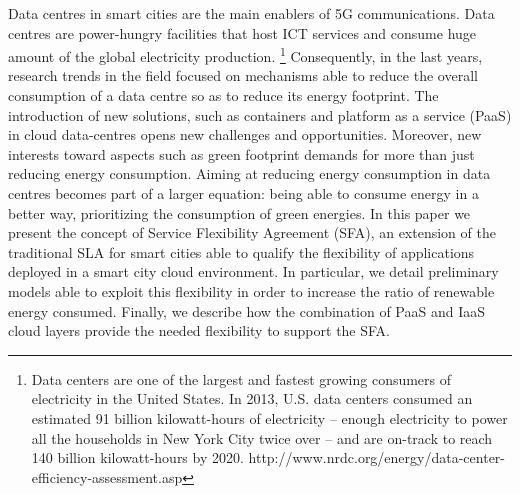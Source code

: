 Data centres in smart cities are the main enablers of 5G communications. Data centres are power-hungry facilities that host ICT services and consume huge amount of the global electricity production. \footnote{Data centers are one of the largest and fastest growing consumers of electricity in the United States. In 2013, U.S. data centers consumed an estimated 91 billion kilowatt-hours of electricity -- enough electricity to power all the households in New York City twice over -- and are on-track to reach 140 billion kilowatt-hours by 2020. http://www.nrdc.org/energy/data-center-efficiency-assessment.asp}
Consequently, in the last years, research trends in the field focused on mechanisms able to reduce the overall consumption of a data centre so as to reduce its energy footprint.
The introduction of new solutions, such as containers and platform as a service (PaaS) in cloud data-centres opens new challenges and opportunities.
Moreover, new interests toward aspects such as green footprint demands for more than just reducing energy consumption. 
Aiming at reducing energy consumption in data centres becomes part of a larger equation: being able to consume energy in a better way, prioritizing the consumption of green energies.
In this paper we present the concept of Service Flexibility Agreement (SFA), an extension of the traditional SLA for smart cities able to qualify the flexibility of applications deployed in a smart city cloud environment.
In particular, we detail preliminary models able to exploit this flexibility in order to increase the ratio of renewable energy consumed.
Finally, we describe how the combination of PaaS and IaaS cloud layers provide the needed flexibility to support the SFA.
